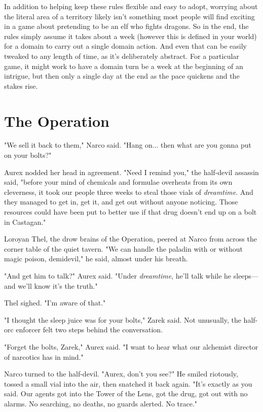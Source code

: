 \documentclass[10pt,a4paper,twoside,bg=print,twocolumn,openany,nodeprecatedcode]{dndbook}
\begin{document}
In addition to helping keep these rules flexible and easy to adopt, worrying about the literal area of a territory likely isn't something most people will find exciting in a game about pretending to be an elf who fights dragons. So in the end, the rules simply assume it takes about a week (however this is defined in your world) for a domain to carry out a single domain action. And even that can be easily tweaked to any length of time, as it's deliberately abstract. For a particular game, it might work to have a domain turn be a week at the beginning of an intrigue, but then only a single day at the end as the pace quickens and the stakes rise.

\section{The Operation}
"We sell it back to them," Narco said. "Hang on... then what are you gonna put on your bolts?"

Aurex nodded her head in agreement. "Need I remind you," the half-devil assassin said, "before your mind of chemicals and formulae overheats from its own cleverness, it took our people three weeks to steal those vials of \textit{dreamtime}. And they managed to get in, get it, and get out without anyone noticing. Those resources could have been put to better use if that drug doesn't end up on a bolt in Castagan."

Loroyan Thel, the drow brains of the Operation, peered at Narco from across the corner table of the quiet tavern. "We can handle the paladin with or without magic poison, demidevil," he said, almost under his breath.

"And get him to talk?" Aurex said. "Under \textit{dreamtime}, he'll talk while he sleeps—and we'll know it's the truth."

Thel sighed. "I'm aware of that."

"I thought the sleep juice was for your bolts," Zarek said. Not unusually, the half-orc enforcer felt two steps behind the conversation.

"Forget the bolts, Zarek," Aurex said. "I want to hear what our alchemist director of narcotics has in mind."

Narco turned to the half-devil. "Aurex, don't you see?" He smiled riotously, tossed a small vial into the air, then snatched it back again. "It's exactly as you said. Our agents got into the Tower of the Lens, got the drug, got out with no alarms. No searching, no deaths, no guards alerted. No trace."
\end{document}
